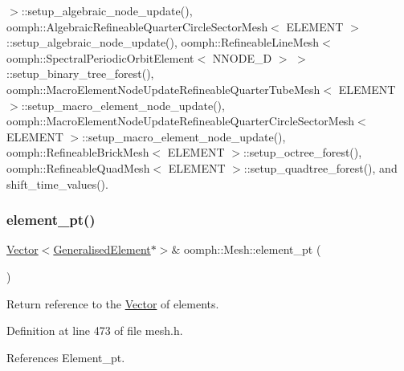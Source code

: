$>$\+::setup\+\_\+algebraic\+\_\+node\+\_\+update(), oomph\+::\+Algebraic\+Refineable\+Quarter\+Circle\+Sector\+Mesh$<$ E\+L\+E\+M\+E\+N\+T $>$\+::setup\+\_\+algebraic\+\_\+node\+\_\+update(), oomph\+::\+Refineable\+Line\+Mesh$<$ oomph\+::\+Spectral\+Periodic\+Orbit\+Element$<$ N\+N\+O\+D\+E\+\_\+D $>$ $>$\+::setup\+\_\+binary\+\_\+tree\+\_\+forest(), oomph\+::\+Macro\+Element\+Node\+Update\+Refineable\+Quarter\+Tube\+Mesh$<$ E\+L\+E\+M\+E\+N\+T $>$\+::setup\+\_\+macro\+\_\+element\+\_\+node\+\_\+update(), oomph\+::\+Macro\+Element\+Node\+Update\+Refineable\+Quarter\+Circle\+Sector\+Mesh$<$ E\+L\+E\+M\+E\+N\+T $>$\+::setup\+\_\+macro\+\_\+element\+\_\+node\+\_\+update(), oomph\+::\+Refineable\+Brick\+Mesh$<$ E\+L\+E\+M\+E\+N\+T $>$\+::setup\+\_\+octree\+\_\+forest(), oomph\+::\+Refineable\+Quad\+Mesh$<$ E\+L\+E\+M\+E\+N\+T $>$\+::setup\+\_\+quadtree\+\_\+forest(), and shift\+\_\+time\+\_\+values().

\mbox{\label{classoomph_1_1Mesh_a669f0cea59f1b60a5e59176c91340ed9}} 
\subsubsection{\texorpdfstring{element\+\_\+pt()}{element\_pt()}\hspace{0.1cm}{\footnotesize\ttfamily [4/4]}}
{\footnotesize\ttfamily \hyperlink{classoomph_1_1Vector}{Vector}$<$\hyperlink{classoomph_1_1GeneralisedElement}{Generalised\+Element}$\ast$$>$\& oomph\+::\+Mesh\+::element\+\_\+pt (\begin{DoxyParamCaption}{ }\end{DoxyParamCaption})\hspace{0.3cm}{\ttfamily [inline]}}



Return reference to the \hyperlink{classoomph_1_1Vector}{Vector} of elements. 



Definition at line 473 of file mesh.\+h.



References Element\+\_\+pt.

\mbox{\label{classoomph_1_1Mesh_a700a3c461df1c52534d7f6e303a0ebb6}} 
